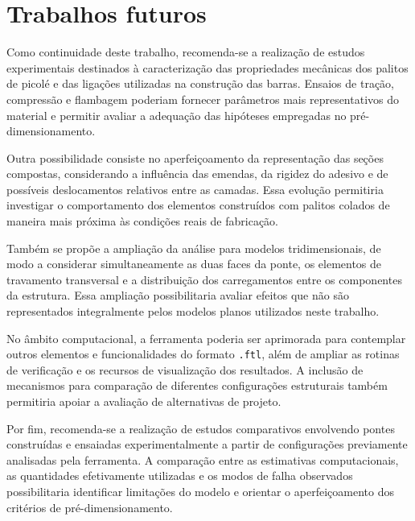 \section{Trabalhos futuros}
\label{sec:trabalhos-futuros}

Como continuidade deste trabalho, recomenda-se a realização de estudos experimentais destinados à caracterização das propriedades mecânicas dos palitos de picolé e das ligações utilizadas na construção das barras. Ensaios de tração, compressão e flambagem poderiam fornecer parâmetros mais representativos do material e permitir avaliar a adequação das hipóteses empregadas no pré-dimensionamento.

Outra possibilidade consiste no aperfeiçoamento da representação das seções compostas, considerando a influência das emendas, da rigidez do adesivo e de possíveis deslocamentos relativos entre as camadas. Essa evolução permitiria investigar o comportamento dos elementos construídos com palitos colados de maneira mais próxima às condições reais de fabricação.

Também se propõe a ampliação da análise para modelos tridimensionais, de modo a considerar simultaneamente as duas faces da ponte, os elementos de travamento transversal e a distribuição dos carregamentos entre os componentes da estrutura. Essa ampliação possibilitaria avaliar efeitos que não são representados integralmente pelos modelos planos utilizados neste trabalho.

No âmbito computacional, a ferramenta poderia ser aprimorada para contemplar outros elementos e funcionalidades do formato \texttt{.ftl}, além de ampliar as rotinas de verificação e os recursos de visualização dos resultados. A inclusão de mecanismos para comparação de diferentes configurações estruturais também permitiria apoiar a avaliação de alternativas de projeto.

Por fim, recomenda-se a realização de estudos comparativos envolvendo pontes construídas e ensaiadas experimentalmente a partir de configurações previamente analisadas pela ferramenta. A comparação entre as estimativas computacionais, as quantidades efetivamente utilizadas e os modos de falha observados possibilitaria identificar limitações do modelo e orientar o aperfeiçoamento dos critérios de pré-dimensionamento.
